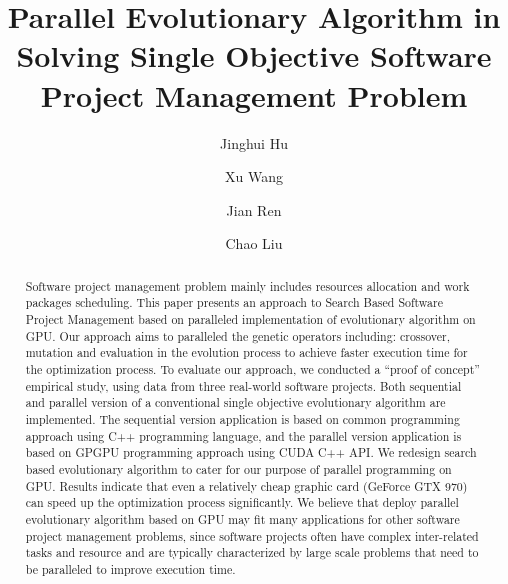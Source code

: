 %

\title{Parallel Evolutionary Algorithm in Solving Single Objective Software Project Management Problem}
%
%
\author{ Jinghui Hu \and Xu Wang \and Jian Ren \and Chao Liu}
%
%
%



\maketitle

\begin{abstract}
Software project management problem mainly includes resources allocation and work packages scheduling.
This paper presents an approach to Search Based Software Project Management based on paralleled implementation of evolutionary algorithm on GPU. 
Our approach aims to paralleled the genetic operators including: crossover, mutation and evaluation in the evolution process to achieve faster execution time for the optimization process.
To evaluate our approach, we conducted a ``proof of concept'' empirical study, using data from three real-world software projects. 
Both sequential and parallel version of a conventional single objective evolutionary algorithm are implemented. 
The sequential version application is based on common programming approach using C++ programming language, and the parallel version application is based on GPGPU programming approach using CUDA C++ API.
We redesign search based evolutionary algorithm to cater for our purpose of parallel programming on GPU.
Results indicate that even a relatively cheap graphic card (GeForce GTX 970) can speed up the optimization process significantly.
We believe that deploy parallel evolutionary algorithm based on GPU  may fit many applications for other software project management problems, since software projects often have complex inter-related tasks and resource and are typically characterized by large scale problems that need to be paralleled to improve execution time.


\end{abstract}
